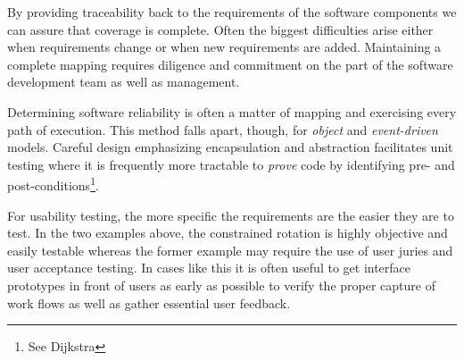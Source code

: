 \documentclass[letterpaper,10pt]{article}
\begin{document}
 By providing traceability back to the requirements of the software components we can assure that coverage is complete.  Often the biggest difficulties arise either when requirements change or when new requirements are added.  Maintaining a complete mapping requires diligence and commitment on the part of the software development team as well as management.
\par
Determining software reliability is often a matter of mapping and exercising every path of execution.  This method falls apart, though, for \emph{object} and \emph{event-driven} models.  Careful design emphasizing encapsulation and abstraction facilitates unit testing where it is frequently more tractable to \emph{prove} code by identifying pre- and post-conditions\footnote{See Dijkstra}.
\par
For usability testing, the more specific the requirements are the easier they are to test.  In the two examples above, the constrained rotation is highly objective and easily testable whereas the former example may require the use of user juries  and user acceptance testing.  In cases like this it is often useful to get interface prototypes in front of users as early as possible to verify the proper capture of work flows as well as gather essential user feedback.
\end{document}
